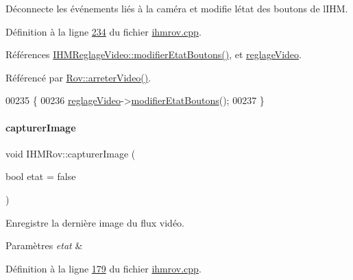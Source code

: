 Déconnecte les événements liés à la caméra et modifie l\textquotesingle{}état des boutons de l\textquotesingle{}I\+HM. 



Définition à la ligne \hyperlink{ihmrov_8cpp_source_l00234}{234} du fichier \hyperlink{ihmrov_8cpp_source}{ihmrov.\+cpp}.



Références \hyperlink{ihmreglagevideo_8cpp_source_l00212}{I\+H\+M\+Reglage\+Video\+::modifier\+Etat\+Boutons()}, et \hyperlink{ihmrov_8h_source_l00048}{reglage\+Video}.



Référencé par \hyperlink{rov_8cpp_source_l00263}{Rov\+::arreter\+Video()}.


\begin{DoxyCode}
00235 \{
00236     \hyperlink{class_i_h_m_rov_a6baa53853d29151404e6ae3dec5d2003}{reglageVideo}->\hyperlink{class_i_h_m_reglage_video_ac838581ba03f52e79064cb91ebabb35d}{modifierEtatBoutons}();
00237 \}
\end{DoxyCode}
\mbox{\label{class_i_h_m_rov_a15fe4fd090a0171bb9ad24e28d3b978a}} 
\paragraph{\texorpdfstring{capturer\+Image}{capturerImage}}
{\footnotesize\ttfamily void I\+H\+M\+Rov\+::capturer\+Image (\begin{DoxyParamCaption}\item[{bool}]{etat = {\ttfamily false} }\end{DoxyParamCaption})\hspace{0.3cm}{\ttfamily [slot]}}



Enregistre la dernière image du flux vidéo. 


\begin{DoxyParams}{Paramètres}
{\em etat} & \\
\hline
\end{DoxyParams}


Définition à la ligne \hyperlink{ihmrov_8cpp_source_l00179}{179} du fichier \hyperlink{ihmrov_8cpp_source}{ihmrov.\+cpp}.



